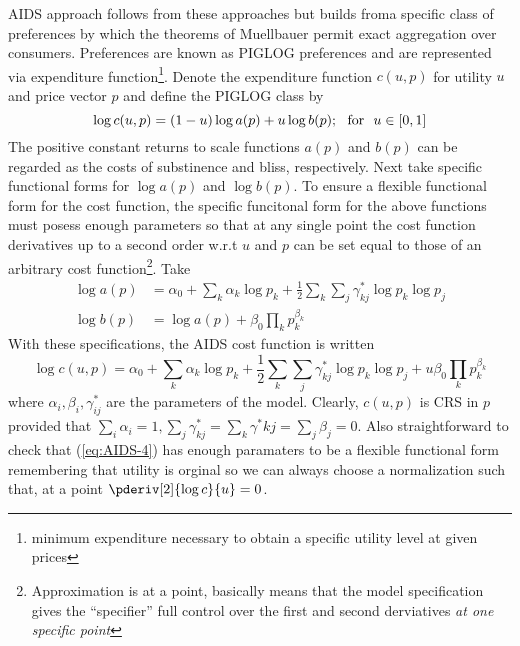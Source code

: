AIDS approach follows from these approaches but builds froma specific class of preferences by which the theorems of Muellbauer permit exact aggregation over consumers. Preferences are known as PIGLOG preferences and are represented via expenditure function\footnote{minimum expenditure necessary to obtain a specific utility level at given prices}. Denote the expenditure function $c(u,p)$ for utility $u$ and price vector $p$ and define the PIGLOG class by
\begin{equation}
	\label{eq:AIDS-1}
	\log c(u,p) = (1-u)\log a(p) + u \log b(p); \hbox{ }\text{ for }\hbox{ }u\in[0,1]
\end{equation}
The positive constant returns to scale functions $a(p)$ and $b(p)$ can be regarded as the costs of substinence and bliss, respectively. Next take specific functional forms for $\log a(p)$ and $\log b(p)$. To ensure a flexible functional form for the cost function, the specific funcitonal form for the above functions must posess enough parameters so that at any single point the cost function derivatives up to a second order w.r.t $u$ and $p$ can be set equal to those of an arbitrary cost function\footnote{Approximation is at a point, basically means that the model specification gives the ``specifier'' full control over the first and second derviatives \emph{at one specific point}}. Take
\begin{align}
    \label{eq:AIDS-2}
    \log a(p) &= \alpha_0 + \sum_k \alpha_k \log p_k + \frac{1}{2}\sum_k \sum_j \gamma^*_{kj} \log p_k \log p_j \\
    \label{eq:AIDS-3}
    \log b(p) &= \log a(p) + \beta_0 \prod_k p_k^{\beta_k}
 \end{align}
 With these specifications, the AIDS cost function is written 
 \begin{equation}
 	\label{eq:AIDS-4}
 	\log c(u,p) = \alpha_0 + \sum_k \alpha_k \log p_k + \frac{1}{2}\sum_k \sum_j \gamma^*_{kj} \log p_k \log p_j + u\beta_0 \prod_k p_k^{\beta_k}
 \end{equation}
 where $\alpha_i, \beta_i, \gamma^*_{ij}$ are the parameters of the model. Clearly, $c(u,p)$ is CRS in $p$ provided that $\sum_i \alpha_i = 1, \sum_j \gamma^*_{kj} = \sum_k \gamma^*{kj} = \sum_j \beta_j = 0$. Also straightforward to check that (\ref{eq:AIDS-4}) has enough paramaters to be a flexible functional form remembering that utility is orginal so we can always choose a normalization such that, at a point $\pderiv[2]{\log c}{u} = 0$. 

